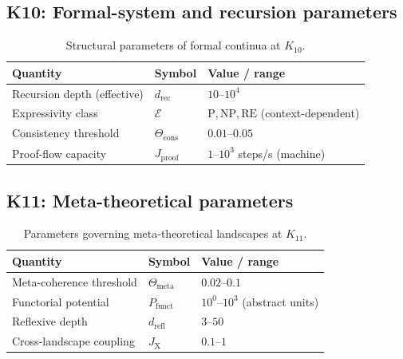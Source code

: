 
\subsection*{K10: Formal-system and recursion parameters}

\begin{table}[htbp]
  \centering
  \caption{Structural parameters of formal continua at \(K_{10}\).}
  \label{tab:k10-formal-parameters}
  \begin{tabular}{@{}L{0.44\textwidth}L{0.16\textwidth}L{0.23\textwidth}@{}}
    \hline
    Quantity & Symbol & Value / range \\
    \hline
    Recursion depth (effective) & \(d_\mathrm{rec}\)
        & \(10\text{–}10^4\) \\
    Expressivity class & \(\mathcal{E}\)
        & \(\mathrm{P}, \mathrm{NP}, \mathrm{RE}\) (context-dependent) \\
    Consistency threshold & \(\Theta_\mathrm{cons}\)
        & \(0.01\text{–}0.05\) \\
    Proof-flow capacity & \(J_\mathrm{proof}\)
        & \(1\text{–}10^3\) steps/s (machine) \\
    \hline
  \end{tabular}
\end{table}


\subsection*{K11: Meta-theoretical parameters}

\begin{table}[htbp]
  \centering
  \caption{Parameters governing meta-theoretical landscapes at \(K_{11}\).}
  \label{tab:k11-meta-parameters}
  \begin{tabular}{@{}L{0.44\textwidth}L{0.16\textwidth}L{0.23\textwidth}@{}}
    \hline
    Quantity & Symbol & Value / range \\
    \hline
    Meta-coherence threshold & \(\Theta_\mathrm{meta}\)
        & \(0.02\text{–}0.1\) \\
    Functorial potential & \(P_\mathrm{funct}\)
        & \(10^0\text{–}10^3\) (abstract units) \\
    Reflexive depth & \(d_\mathrm{refl}\)
        & \(3\text{–}50\) \\
    Cross-landscape coupling & \(J_\mathrm{X}\)
        & \(0.1\text{–}1\) \\
    \hline
  \end{tabular}
\end{table}

